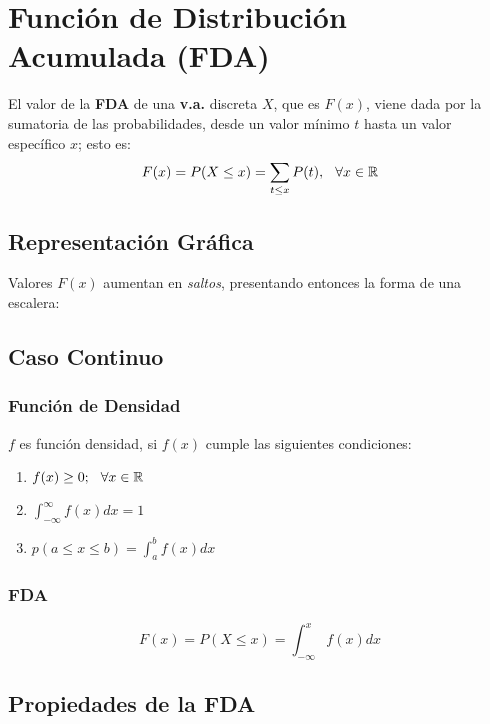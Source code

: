 \section{Función de Distribución Acumulada (FDA)}
El valor de la \textbf{FDA} de una \textbf{v.a.} discreta $X$, que es $F(x)$, viene dada por la sumatoria de las probabilidades, desde un valor mínimo $t$ hasta un valor específico $x$; esto es:
$$F(x)=P(X\leq x)=\displaystyle\sum_{t\leq x} P(t),\hspace{0.25cm} \forall x\in \mathbb{R}$$
\subsection{Representación Gráfica}
Valores $F(x)$ aumentan en \textit{saltos}, presentando entonces la forma de una escalera:
\subsection{Caso Continuo}
\subsubsection{Función de Densidad}
$f$ es función densidad, si $f(x)$ cumple las siguientes condiciones:
\begin{enumerate}[label=(\roman*)]
\item $f(x)\geq 0;\hspace{0.25cm} \forall x\in \mathbb{R}$
\item $\displaystyle\int_{-\infty}^{\infty}f(x) dx = 1$
\item $p(a\leq x \leq b)=\displaystyle\int_{a}^{b}f(x)dx$
\end{enumerate}
\subsubsection{FDA}
$$F(x)=P(X\leq x)=\displaystyle\int_{-\infty}^{x} f(x) dx$$
\subsection{Propiedades de la FDA}
